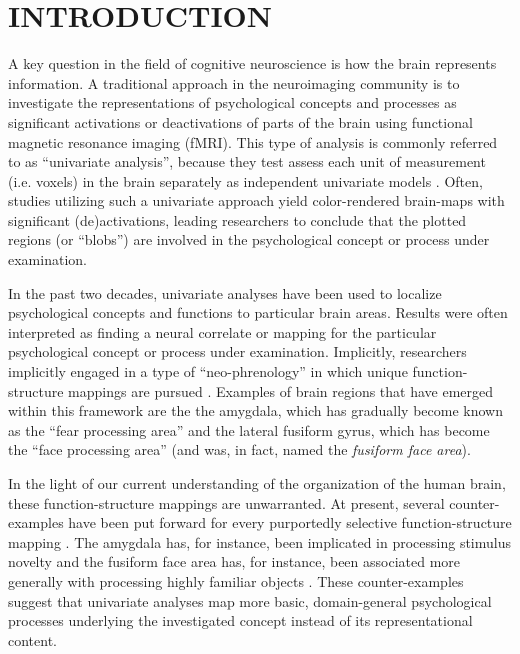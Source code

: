 \documentclass[jou,12pt,a4paper]{apa6}
\begin{document}

\maketitle

\section{INTRODUCTION}
A key question in the field of cognitive neuroscience is how the brain represents information. A traditional approach in the neuroimaging community is to investigate the representations of psychological concepts and processes as significant activations or deactivations of parts of the brain using functional magnetic resonance imaging (fMRI). This type of analysis is commonly referred to as ``univariate analysis'', because they test assess each unit of measurement (i.e. voxels) in the brain separately as independent univariate models \cite{friston1994}. Often, studies utilizing such a univariate approach yield color-rendered brain-maps with significant (de)activations, leading researchers to conclude that the plotted regions (or ``blobs'') are involved in the psychological concept or process under examination. 

In the past two decades, univariate analyses have been used to localize psychological concepts and functions to particular brain areas. Results were often interpreted as finding a neural correlate or mapping for the particular psychological concept or process under examination. Implicitly, researchers implicitly engaged in a type of ``neo-phrenology'' in which unique function-structure mappings are pursued \cite{poldrack2010}. Examples of brain regions that have emerged within this framework are the the amygdala, which has gradually become known as the ``fear processing area'' \cite{ledoux2003} and the lateral fusiform gyrus, which has become the ``face processing area'' (and was, in fact, named the \emph{fusiform face area}).  

In the light of our current understanding of the organization of the human brain, these function-structure mappings are unwarranted. At present, several counter-examples have been put forward for every purportedly selective function-structure mapping \cite{poldrack2010}. The amygdala has, for instance, been implicated in processing stimulus novelty \cite{blackford2010} and the fusiform face area has, for instance, been associated more generally with processing highly familiar objects \cite{tarr2000}. These counter-examples suggest that univariate analyses map more basic, domain-general psychological processes underlying the investigated concept instead of its representational content.
\end{document}
